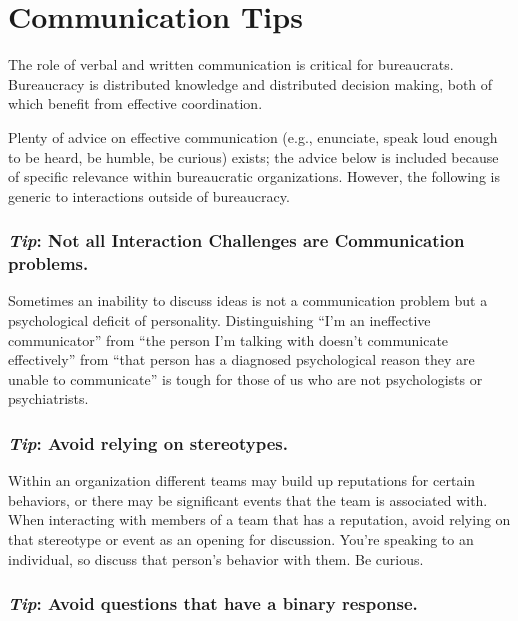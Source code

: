 \section{Communication Tips}

The role of verbal and written communication is critical for bureaucrats. Bureaucracy is distributed knowledge and distributed decision making, both of which benefit from effective coordination. 


Plenty of advice on effective communication (e.g., enunciate, speak loud enough to be heard, be humble, be curious) exists; the advice below is included because of specific relevance within bureaucratic organizations. 
However, the following is generic to interactions outside of bureaucracy. 


\subsubsection*{\textit{Tip}: Not all Interaction Challenges are Communication problems.}
Sometimes an inability to discuss ideas is not a communication problem but a psychological deficit of personality. Distinguishing ``I'm an ineffective communicator'' from ``the person I'm talking with doesn't communicate effectively'' from ``that person has a diagnosed psychological reason they are unable to communicate'' is tough for those of us who are not psychologists or psychiatrists. 


\subsubsection*{\textit{Tip}: Avoid relying on stereotypes.}
Within an organization different teams may build up reputations for certain behaviors, or there may be significant events that the team is associated with. 
When interacting with members of a team that has a reputation, avoid relying on that stereotype or event as an opening for discussion. 
You're speaking to an individual, so discuss that person's behavior with them. Be curious.



\subsubsection*{\textit{Tip}: Avoid questions that have a binary response\label{sec:yes-no-questions}.}

